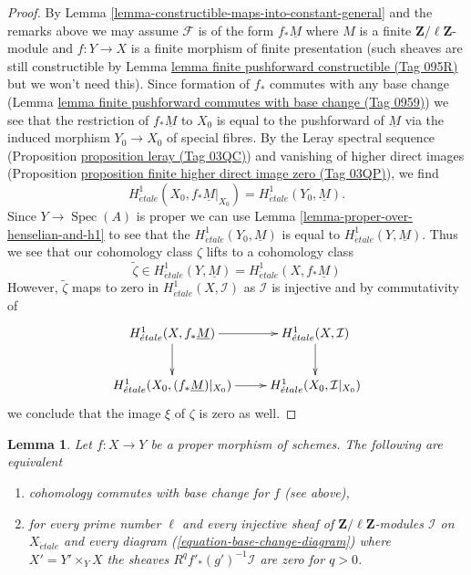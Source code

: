 \documentclass{amsart}
\theoremstyle{plain}
\newtheorem{lemma}[subsection]{Lemma}
\theoremstyle{definition}
\theoremstyle{remark}
\numberwithin{equation}{subsection}
\def\Spec{\mathop{\mathrm{Spec}}}
\def\etale{{\acute{e}tale}}
\begin{document}
\begin{proof}
\medskip\noindent
By Lemma \ref{lemma-constructible-maps-into-constant-general}
and the remarks above we may assume $\mathcal{F}$
is of the form $f_*\underline{M}$ where $M$ is a finite
$\mathbf{Z}/\ell\mathbf{Z}$-module
and $f : Y \to X$ is a finite morphism of finite presentation
(such sheaves are still constructible by
Lemma \href{https://stacks.math.columbia.edu/tag/095R}{lemma finite pushforward constructible (Tag 095R)}
but we won't need this).
Since formation of $f_*$ commutes with any base change
(Lemma \href{https://stacks.math.columbia.edu/tag/0959}{lemma finite pushforward commutes with base change (Tag 0959)})
we see that the restriction of $f_*\underline{M}$ to $X_0$ is
equal to the pushforward of $\underline{M}$ via the induced morphism
$Y_0 \to X_0$ of special fibres. By the Leray spectral sequence
(Proposition \href{https://stacks.math.columbia.edu/tag/03QC}{proposition leray (Tag 03QC)})
and vanishing of higher direct images
(Proposition \href{https://stacks.math.columbia.edu/tag/03QP}{proposition finite higher direct image zero (Tag 03QP)}),
we find
$$
H^1_\etale(X_0, f_*\underline{M}|_{X_0}) = H^1_\etale(Y_0, \underline{M}).
$$
Since $Y \to \Spec(A)$ is proper we can use
Lemma \ref{lemma-proper-over-henselian-and-h1} to see that
the $H^1_\etale(Y_0, \underline{M})$ is equal to
$H^1_\etale(Y, \underline{M})$. Thus we see that our cohomology
class $\zeta$ lifts to a cohomology class
$$
\tilde\zeta \in H^1_\etale(Y, \underline{M}) = H^1_\etale(X, f_*\underline{M})
$$
However, $\tilde \zeta$ maps to zero in
$H^1_\etale(X, \mathcal{I})$ as $\mathcal{I}$ is injective
and by commutativity of
$$
\xymatrix{
H^1_\etale(X, f_*\underline{M}) \ar[r] \ar[d] &
H^1_\etale(X, \mathcal{I}) \ar[d] \\
H^1_\etale(X_0, (f_*\underline{M})|_{X_0}) \ar[r] &
H^1_\etale(X_0, \mathcal{I}|_{X_0})
}
$$
we conclude that the image $\xi$ of $\zeta$ is zero as well.
\end{proof}


\begin{lemma}
\label{lemma-proper-base-change-in-terms-of-injectives}
Let $f : X \to Y$ be a proper morphism of schemes.
The following are equivalent
\begin{enumerate}
\item cohomology commutes with base change for $f$ (see above),
\item for every prime number $\ell$ and every injective
sheaf of $\mathbf{Z}/\ell\mathbf{Z}$-modules $\mathcal{I}$
on $X_\etale$ and every diagram (\ref{equation-base-change-diagram})
where $X' = Y' \times_Y X$ the sheaves
$R^qf'_*(g')^{-1}\mathcal{I}$ are zero for $q > 0$.
\end{enumerate}
\end{lemma}
\end{document}
